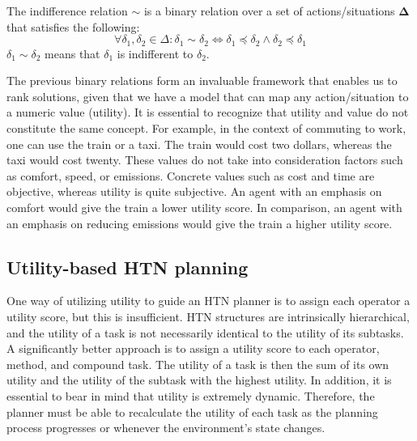 \begin{Tdef}
    The indifference relation $\sim$ is a binary relation over a set of actions/situations $\mathbf{\Delta}$ that satisfies the following:
    $$\forall \delta_1, \delta_2 \in \Delta : \delta_1 \sim \delta_2 \Longleftrightarrow \delta_1 \preceq \delta_2 \wedge \delta_2 \preceq \delta_1$$
    $\delta_1 \sim \delta_2$ means that $\delta_1$ is indifferent to $\delta_2$.
\end{Tdef}

The previous binary relations form an invaluable framework that enables us to rank solutions, given that we have a model that can map any action/situation to a numeric value (utility). It is essential to recognize that utility and value do not constitute the same concept. For example, in the context of commuting to work, one can use the train or a taxi. The train would cost two dollars, whereas the taxi would cost twenty. These values do not take into consideration factors such as comfort, speed, or emissions. Concrete values such as cost and time are objective, whereas utility is quite subjective. An agent with an emphasis on comfort would give the train a lower utility score. In comparison, an agent with an emphasis on reducing emissions would give the train a higher utility score.


\subsection{Utility-based HTN planning}
One way of utilizing utility to guide an HTN planner is to assign each operator a utility score, but this is insufficient. HTN structures are intrinsically hierarchical, and the utility of a task is not necessarily identical to the utility of its subtasks. A significantly better approach is to assign a utility score to each operator, method, and compound task. The utility of a task is then the sum of its own utility and the utility of the subtask with the highest utility. In addition, it is essential to bear in mind that utility is extremely dynamic. Therefore, the planner must be able to recalculate the utility of each task as the planning process progresses or whenever the environment's state changes.


